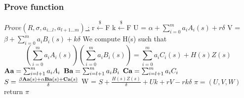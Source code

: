 \subsubsection{Prove function}
\underline{$Prove(R, \sigma, a_{i...l}, a_{l+1...m})$ :}
\tabNormal r$\xleftarrow[]{\$}$F
\tabNormal k$\xleftarrow[]{\$}$F
\tabNormal U = $\alpha + \sum_{i=0}^{m} a_i A_i (s) + r\delta $
\tabNormal V = $\beta + \sum_{i=0}^{m} a_i B_i (s) + k\delta $
\tabNormal We compute H(s) such that  \[ (\sum_{i=0}^m a_i A_i(s)) (\sum_{i=0}^m a_i B_i(s)) = \sum_{i=0}^m a_i C_i(s) + H(s) Z(s) \]
\tabNormal $\textbf{Aa} =\sum_{i=l+1}^m a_i A_i$
\tabNormal $\textbf{Ba}=\sum_{i=l+1}^m a_i B_i$
\tabNormal $\textbf{Ca} =\sum_{i=l+1}^m a_i C_i$
\tabNormal $S=\frac{\beta \textbf{Aa} (s) + \alpha \textbf{Ba} (s) + \textbf{Ca} (s)}{\delta}$
\tabNormal W = $S + \frac{H(s)Z(s)}{\delta} + Uk + rV - rk\delta $
\tabNormal $\pi = (U,V,W)$ 
\tabNormal return $\pi$